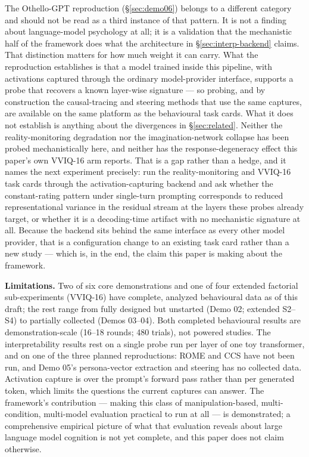 \documentclass[11pt]{article}
\begin{document}
The Othello-GPT reproduction (\S\ref{sec:demo06}) belongs to a different
category and should not be read as a third instance of that pattern. It is
not a finding about language-model psychology at all; it is a validation
that the mechanistic half of the framework does what the architecture in
\S\ref{sec:interp-backend} claims. That distinction matters for how much
weight it can carry. What the reproduction establishes is that a model
trained inside this pipeline, with activations captured through the
ordinary model-provider interface, supports a probe that recovers a known
layer-wise signature --- so probing, and by construction the causal-tracing
and steering methods that use the same captures, are available on the same
platform as the behavioural task cards. What it does not establish is
anything about the divergences in \S\ref{sec:related}. Neither the
reality-monitoring degradation \citep{ranjan2026reality} nor the
imagination-network collapse \citep{ranjan2025psychological} has been
probed mechanistically here, and neither has the response-degeneracy effect
this paper's own VVIQ-16 arm reports. That is a gap rather than a hedge,
and it names the next experiment precisely: run the reality-monitoring and
VVIQ-16 task cards through the activation-capturing backend and ask whether
the constant-rating pattern under single-turn prompting corresponds to
reduced representational variance in the residual stream at the layers
these probes already target, or whether it is a decoding-time artifact with
no mechanistic signature at all. Because the backend sits behind the same
interface as every other model provider, that is a configuration change to
an existing task card rather than a new study --- which is, in the end, the
claim this paper is making about the framework.

\textbf{Limitations.} Two of six core demonstrations and one of four
extended factorial sub-experiments (VVIQ-16) have complete, analyzed
behavioural data as of this draft; the rest range from fully designed but
unstarted (Demo 02; extended S2--S4) to partially collected (Demos
03--04). Both completed behavioural results are demonstration-scale (16--18
rounds; 480 trials), not powered studies. The interpretability results rest
on a single probe run per layer of one toy transformer, and on one of the
three planned reproductions: ROME and CCS have not been run, and Demo 05's
persona-vector extraction and steering has no collected data. Activation
capture is over the prompt's forward pass rather than per generated token,
which limits the questions the current captures can answer. The framework's
contribution --- making this class of manipulation-based, multi-condition,
multi-model evaluation practical to run at all --- is demonstrated; a
comprehensive empirical picture of what that evaluation reveals about large
language model cognition is not yet complete, and this paper does not claim
otherwise.

\appendix





\end{document}
